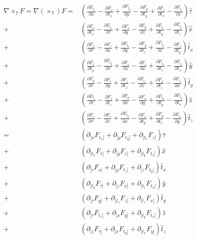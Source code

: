 \documentclass{article}
\begin{document}
\setlength{\jot}{7pt}
\begin{align*}
\nabla \times_{7} F = \nabla(\times_{7})F =& \left(\frac{\partial F_{t_x}}{\partial x} - \frac{\partial F_x}{\partial t_x} + \frac{\partial F_{t_y}}{\partial y} - \frac{\partial F_y}{\partial t_y} + \frac{\partial F_z}{\partial t_z} - \frac{\partial F_{t_z}}{\partial z}\right) \hat{\tau} \\
+& \left(\frac{\partial F_\tau}{\partial t_x} - \frac{\partial F_{t_x}}{\partial \tau} + \frac{\partial F_z}{\partial y} - \frac{\partial F_y}{\partial z} + \frac{\partial F_{t_z}}{\partial t_y} - \frac{\partial F_{t_y}}{\partial t_z}\right) \hat{x} \\
+& \left(\frac{\partial F_x}{\partial \tau} - \frac{\partial F_\tau}{\partial x} + \frac{\partial F_{t_z}}{\partial y} - \frac{\partial F_y}{\partial t_z} + \frac{\partial F_{t_y}}{\partial z} - \frac{\partial F_z}{\partial t_y}\right) \hat{t}_x \\
+& \left(\frac{\partial F_\tau}{\partial t_y} - \frac{\partial F_{t_y}}{\partial \tau} + \frac{\partial F_x}{\partial z} - \frac{\partial F_z}{\partial x} + \frac{\partial F_{t_x}}{\partial t_z} - \frac{\partial F_{t_z}}{\partial t_x}\right) \hat{y} \\
+& \left(\frac{\partial F_y}{\partial \tau} - \frac{\partial F_\tau}{\partial y} + \frac{\partial F_z}{\partial t_x} - \frac{\partial F_{t_x}}{\partial z} + \frac{\partial F_x}{\partial t_z} - \frac{\partial F_{t_z}}{\partial x}\right) \hat{t}_y \\
+& \left(\frac{\partial F_{t_z}}{\partial \tau} - \frac{\partial F_\tau}{\partial t_z} + \frac{\partial F_y}{\partial x} - \frac{\partial F_x}{\partial y} + \frac{\partial F_{t_x}}{\partial t_y} - \frac{\partial F_{t_y}}{\partial t_x}\right) \hat{z} \\
+& \left(\frac{\partial F_z}{\partial \tau} - \frac{\partial F_\tau}{\partial z} + \frac{\partial F_{t_y}}{\partial x} - \frac{\partial F_x}{\partial t_y} + \frac{\partial F_y}{\partial t_x} - \frac{\partial F_{t_x}}{\partial y}\right) \hat{t}_z\\[3mm]
=& \left(\partial_{[x}F_{t_x]} + \partial_{[y}F_{t_y]} + \partial_{[t_z}F_{z]}\right) \hat{\tau} \\
+& \left(\partial_{[t_x}F_{\tau]} + \partial_{[y}F_{z]} + \partial_{[t_y}F_{t_z]}\right) \hat{x} \\
+& \left(\partial_{[\tau}F_{x]} + \partial_{[y}F_{t_z]} + \partial_{[z}F_{t_y]}\right) \hat{t}_x \\
+& \left(\partial_{[t_y}F_{\tau]} + \partial_{[z}F_{x]} + \partial_{[t_z}F_{t_x]}\right) \hat{y} \\
+& \left(\partial_{[\tau}F_{y]} + \partial_{[t_x}F_{z]} + \partial_{[t_z}F_{x]}\right) \hat{t}_y \\
+& \left(\partial_{[\tau}F_{t_z]} + \partial_{[x}F_{y]} + \partial_{[t_y}F_{t_x]}\right) \hat{z} \\
+& \left(\partial_{[z}F_{\tau]} + \partial_{[x}F_{t_y]} + \partial_{[t_x}F_{y]}\right) \hat{t}_z
\end{align*}
\end{document}
